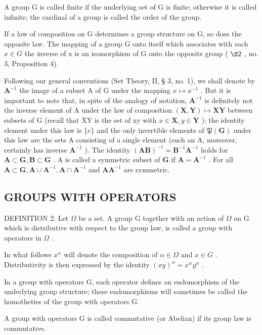 A group G is called finite if the underlying set of G is finite; otherwise it is called infinite; the cardinal of a group is called the order of the group.

If a law of composition on G determines a group structure on G, so does the opposite law. The mapping of a group G onto itself which associates with each \(x \in G\) the inverse of x is an isomorphism of G onto the opposite group ( \(\S 2\) , no. 3, Proposition 4).

Following our general conventions (Set Theory, II, § 3, no. 1), we shall denote by \(\mathbf{A}^{-1}\) the image of a subset A of G under the mapping \(x \mapsto x^{-1}\) . But it is important to note that, in spite of the analogy of notation, \(\mathbf{A}^{-1}\) is definitely not the inverse element of A under the law of composition \((\mathbf{X}, \mathbf{Y}) \mapsto \mathbf{XY}\) between subsets of G (recall that XY is the set of xy with \(x \in \mathbf{X}, y \in \mathbf{Y}\) ): the identity element under this law is \(\{e\}\) and the only invertible elements of \(\mathfrak{P}(\mathbf{G})\) under this law are the sets A consisting of a single element (such an A, moreover, certainly has inverse \(\mathbf{A}^{-1}\) ). The identity \((\mathbf{AB})^{-1} = \mathbf{B}^{-1}\mathbf{A}^{-1}\) holds for \(\mathbf{A} \subset \mathbf{G}, \mathbf{B} \subset \mathbf{G}\) . A is called a symmetric subset of \(\mathbf{G}\) if \(\mathbf{A} = \mathbf{A}^{-1}\) . For all \(\mathbf{A} \subset \mathbf{G}, \mathbf{A} \cup \mathbf{A}^{-1}, \mathbf{A} \cap \mathbf{A}^{-1}\) and \(\mathbf{AA}^{-1}\) are symmetric.

\subsection{GROUPS WITH OPERATORS}

DEFINITION 2. Let \(\Omega\) be a set. A group G together with an action of \(\Omega\) on G which is distributive with respect to the group law, is called a group with operators in \(\Omega\) .

In what follows \(x^{\alpha}\) will denote the composition of \(\alpha\in\Omega\) and \(x\in G\) . Distributivity is then expressed by the identity \((xy)^{\alpha}=x^{\alpha}y^{\alpha}\) .

In a group with operators G, each operator defines an endomorphism of the underlying group structure; these endomorphisms will sometimes be called the homotheties of the group with operators G.

A group with operators G is called commutative (or Abelian) if its group law is commutative.

